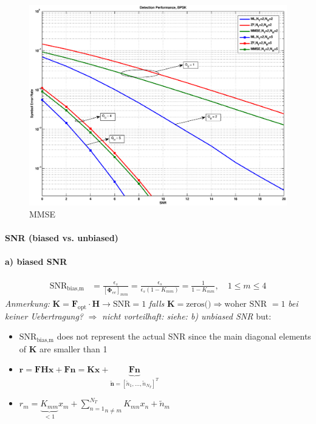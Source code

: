 \documentclass[a4paper, 10pt]{article}
\begin{document}
	\begin{figure}[h]
		\centering
		\includegraphics[width = \textwidth]{MMSE}
		\caption{MMSE}
		\label{MMSE}
	\end{figure}
	
\paragraph{SNR (biased vs. unbiased)}
\paragraph{a) biased SNR}
\begin{align*}
	\text{SNR}_{\text{bias,m}} &= \frac{\epsilon_s}{[\boldsymbol{\Phi}_{ee}]_{mm}} = \frac{\epsilon_s}{\epsilon_s(1 - K_{mm})} = \frac{1}{1 - K_{mm}}, \quad 1\leq m \leq 4 
\end{align*}
	\textit{Anmerkung: } $\mathbf{K} = \mathbf{F}_{\text{opt}}\cdot\mathbf{H} \rightarrow \text{SNR} = 1 $ \textit{falls } $ \mathbf{K} = \text{zeros()} \Rightarrow \text{woher SNR } = 1 $ \textit{ bei keiner Uebertragung?} $\Rightarrow $ \textit{ nicht vorteilhaft: siehe: b) unbiased SNR}  %
but: 
\begin{itemize}
	\item $\text{SNR}_{\text{bias,m}} $ does not represent the actual SNR since the main diagonal elements of $ \mathbf{K} $ are smaller than 1
	\item $ \mathbf{r} = \mathbf{FHx} + \mathbf{Fn} = \mathbf{Kx} + \underbrace{\mathbf{F}\mathbf{n} }_{\mathbf{\tilde{n}} = [\tilde{n}_1, \dots,\tilde{n}_{N_T}]^T } $
	\item $r_m = \underbrace{K_{mm}}_{<1}x_m + \underset{ n\neq m}{\sum\limits^{N_T}_{n = 1}}K_{mn}x_n + \tilde{n}_m $
\end{itemize}
\end{document}

